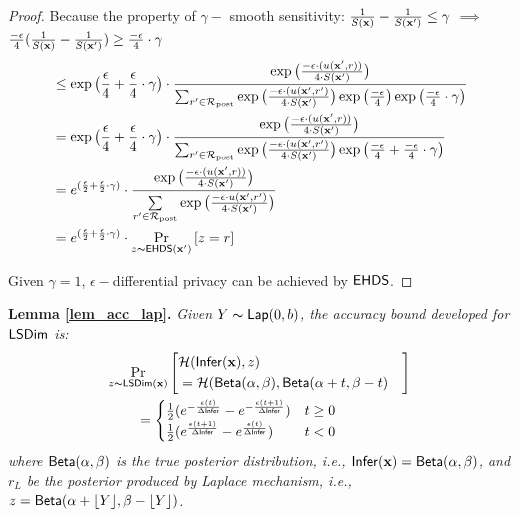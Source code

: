 \documentclass{article}
\begin{document}
\begin{proof}
  Because the property of $\gamma -$ smooth sensitivity: $\frac{1}{S(\textbf{x})} - \frac{1}{S(\textbf{x}')} \leq \gamma$ $\implies$
  $\frac{- \epsilon}{4}
  (\frac{1}{S(\textbf{x})}-
  \frac{1}{S(\textbf{x}')}) \geq \frac{- \epsilon}{4} \cdot \gamma$
  \begin{equation*}
  \begin{split}
  & \leq \exp\big( \frac{\epsilon}{4} + \frac{\epsilon}{4} \cdot \gamma\big) \cdot 
  \frac {
  \exp
  \big(
  \frac{-\epsilon\cdot(u(\textbf{x}', {r}))}{4\cdot S(\textbf{x}')}
  \big)
  } 
  {
  \sum_{r'\in \mathcal{R}_{\textup{post}}} 
  \exp 
  \big(
  \frac{-\epsilon\cdot(u(\textbf{x}', {r'})}{4 \cdot S(\textbf{x}')}
  \big)
  \exp 
  \big(
  \frac{-\epsilon}{4}
  \big)
  \exp
  \big(
  \frac{- \epsilon}{4} \cdot \gamma
  \big)
  }\\
  & = \exp\big( \frac{\epsilon}{4} + \frac{\epsilon}{4} \cdot \gamma\big) \cdot 
  \frac {
  \exp
  \big(
  \frac{-\epsilon\cdot(u(\textbf{x}', {r}))}{4\cdot S(\textbf{x}')}
  \big)
  } 
  {
  \sum_{r'\in \mathcal{R}_{\textup{post}}} 
  \exp 
  \big(
  \frac{-\epsilon\cdot(u(\textbf{x}', {r'})}{4 \cdot S(\textbf{x}')}
  \big)
  \exp 
  \big(
  \frac{-\epsilon}{4} +   \frac{- \epsilon}{4} \cdot \gamma
  \big)
  }\\
  & = e^{( \frac{\epsilon}{2} + \frac{\epsilon}{2} \cdot \gamma )} \cdot 
  \frac {
  \exp
  \big(
  \frac{-\epsilon\cdot(u(\textbf{x}', {r}))}{4\cdot S(\textbf{x}')}
  \big)
  } 
  {
  \sum\limits_{r'\in \mathcal{R}_{\textup{post}}} \exp \big(\frac{-\epsilon\cdot u(\textbf{x}', r')}{4 \cdot S(\textbf{x}')}\big)
  }\\
  & = e^{( \frac{\epsilon}{2} + \frac{\epsilon}{2} \cdot \gamma )} \cdot   \underset{z \thicksim \mathsf{EHDS}(\textbf{x}')}{\Pr}\left[ z = r \right]
  \end{split}
  \end{equation*}

  Given $\gamma = 1$, $\epsilon - $differential privacy can be achieved by $\mathsf{EHDS}$.


\end{proof}


\noindent \textbf{ Lemma \ref{lem_acc_lap}.}
\emph{
Given $Y \thicksim \mathsf{Lap}(0, b)$, the accuracy bound developed for $\mathsf{LSDim}$ is:
\begin{align*}
&
\lapmechPr{\dataobs}{
\begin{aligned}
\lefteqn{\hellinger(\bysinfer(\dataobs), z )}\\ 
&= \hellinger(\betad(\alpha, \beta), \betad(\alpha + t, \beta - t)
\end{aligned}
}
\\
&\qquad = 
\begin{cases}
\frac{1}{2} (e^{- \frac{\epsilon (t)}{\Delta \bysinfer}} - e^{- \frac{\epsilon (t + 1)}{\Delta \bysinfer}}) &  t \geq 0\\
\frac{1}{2} (e^{\frac{\epsilon (t + 1)}{\Delta \bysinfer}} - e^{\frac{\epsilon (t)}{\Delta \bysinfer}}) & t < 0
\end{cases}
\end{align*}
where $\mathsf{Beta}(\alpha, \beta)$ is the true posterior distribution, i.e., $\mathsf{Infer}(\textbf{x}) = \mathsf{Beta}(\alpha, \beta)$, and $r_L$ be the posterior produced by Laplace mechanism, i.e., $z = \mathsf{Beta}(\alpha + \lfloor Y \rfloor, \beta - \lfloor Y \rfloor)$.
}
\end{document}
